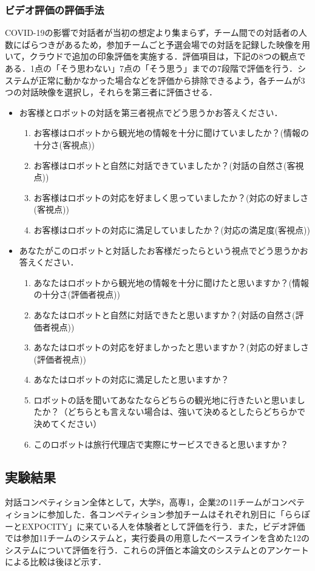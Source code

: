 \subsubsection{ビデオ評価の評価手法}
COVID-19の影響で対話者が当初の想定より集まらず，チーム間での対話者の人数にばらつきがあるため，参加チームごと予選会場での対話を記録した映像を用いて，クラウドで追加の印象評価を実施する．評価項目は，下記の8つの観点である．1点の「そう思わない」7点の「そう思う」までの7段階で評価を行う．システムが正常に動かなかった場合などを評価から排除できるよう，各チームが3つの対話映像を選択し，それらを第三者に評価させる．
\begin{itemize}
    \item お客様とロボットの対話を第三者視点でどう思うかお答えください．
    \begin{enumerate}
        \item お客様はロボットから観光地の情報を十分に聞けていましたか？(情報の十分さ(客視点))
        \item お客様はロボットと自然に対話できていましたか？(対話の自然さ(客視点))
        \item お客様はロボットの対応を好ましく思っていましたか？(対応の好ましさ(客視点))
        \item お客様はロボットの対応に満足していましたか？(対応の満足度(客視点))
    \end{enumerate}
    \item あなたがこのロボットと対話したお客様だったらという視点でどう思うかお答えください．
    \begin{enumerate}
        \item あなたはロボットから観光地の情報を十分に聞けたと思いますか？(情報の十分さ(評価者視点))
        \item あなたはロボットと自然に対話できたと思いますか？(対話の自然さ(評価者視点))
        \item あなたはロボットの対応を好ましかったと思いますか？(対応の好ましさ(評価者視点))
        \item あなたはロボットの対応に満足したと思いますか？
        \item ロボットの話を聞いてあなたならどちらの観光地に行きたいと思いましたか？（どちらとも言えない場合は、強いて決めるとしたらどちらかで決めてください）
        \item このロボットは旅行代理店で実際にサービスできると思いますか？
    \end{enumerate}
\end{itemize}

\subsection{実験結果}
対話コンペティション全体として，大学8，高専1，企業2の11チームがコンペティションに参加した．各コンペティション参加チームはそれぞれ別日に「ららぽーとEXPOCITY」に来ている人を体験者として評価を行う．また，ビデオ評価では参加11チームのシステムと，実行委員の用意したベースラインを含めた12のシステムについて評価を行う．これらの評価と本論文のシステムとのアンケートによる比較は後ほど示す．

